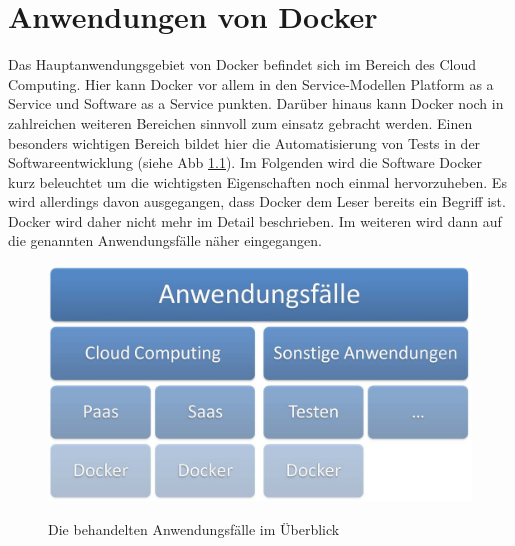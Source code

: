 \chapter{Anwendungen von Docker}
\label{cha:anwendungen_von_docker}
Das Hauptanwendungsgebiet von Docker befindet sich im Bereich des Cloud Computing. Hier kann Docker vor allem in den Service-Modellen Platform as a Service und Software as a Service punkten. Darüber hinaus kann Docker noch in zahlreichen weiteren Bereichen sinnvoll zum einsatz gebracht werden. Einen besonders wichtigen Bereich bildet hier die Automatisierung von Tests in der Softwareentwicklung (siehe Abb \ref{fig:anwendungsfaelle}).
Im Folgenden wird die Software Docker kurz beleuchtet um die wichtigsten Eigenschaften noch einmal hervorzuheben. Es wird allerdings davon ausgegangen, dass Docker dem Leser bereits ein Begriff ist. Docker wird daher nicht mehr im Detail beschrieben. Im weiteren wird dann auf die genannten Anwendungsfälle näher eingegangen.
\begin{figure}[htbp]
  \centering  
  \includegraphics[scale=0.7]{img/anwaendungsfaelle.jpg}\\
  \caption{Die behandelten Anwendungsfälle im Überblick}
  \label{fig:anwendungsfaelle}
\end{figure}

